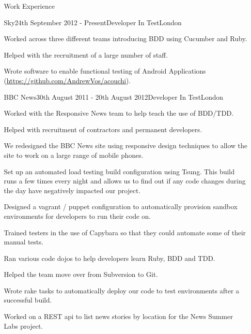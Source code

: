 \documentclass{resume}
\begin{document}
  \begin{rSection}{Work Experience}
    \begin{rSubsection}{Sky}{24th September 2012 - Present}{Developer In Test}{London}
      \item Worked across three different teams introducing BDD using Cucumber and Ruby.
      \item Helped with the recruitment of a large number of staff.
      \item Wrote software to enable functional testing of Android Applications (\url{https://github.com/AndrewVos/acouchi}).
    \end{rSubsection}

    \begin{rSubsection}{BBC News}{30th August 2011 - 20th August 2012}{Developer In Test}{London}
      \item Worked with the Responsive News team to help teach the use of BDD/TDD.
      \item Helped with recruitment of contractors and permanent developers.
      \item We redesigned the BBC News site using responsive design techniques to allow the site to work on a large range of mobile phones.
      \item Set up an automated load testing build configuration using Tsung. This build runs a few times every night and allows us to find out if any code changes during the day have negatively impacted our project.
      \item Designed a vagrant / puppet configuration to automatically provision sandbox environments for developers to run their code on.
      \item Trained testers in the use of Capybara so that they could automate some of their manual tests.
      \item Ran various code dojos to help developers learn Ruby, BDD and TDD.
      \item Helped the team move over from Subversion to Git.
      \item Wrote rake tasks to automatically deploy our code to test environments after a successful build.
      \item Worked on a REST api to list news stories by location for the News Summer Labs project.
    \end{rSubsection}


\end{rSection}
\end{document}
